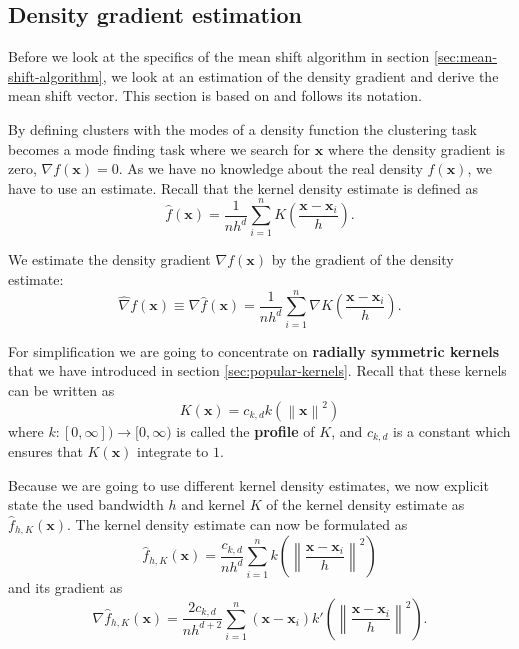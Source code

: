 \documentclass{article}
\newcommand{\norm}[1]{\left\lVert#1\right\rVert}
\begin{document}
\subsection{Density gradient estimation} \label{sec:density-gradient-estimation}

Before we look at the specifics of the mean shift algorithm in section \ref{sec:mean-shift-algorithm}, we look at an estimation of the density gradient and derive the mean shift vector. This section is based on \cite{Comaniciu.2002} and follows its notation.

By defining clusters with the modes of a density function the clustering task becomes a mode finding task where we search for $\bm{x}$ where the density gradient is zero, $\nabla f(\bm{x}) = 0$. As we have no knowledge about the real density $f(\bm{x})$, we have to use an estimate. Recall that the kernel density estimate is defined as
\begin{equation}
	\hat{f}(\bm{x}) = \frac{1}{nh^d} \sum_{i=1}^n K\left(\frac{\bm{x} - \bm{x}_i}{h} \right)\text{.}
\end{equation}

We estimate the density gradient $\nabla f(\bm{x})$ by the gradient of the density estimate:
\begin{equation}
	\hat\nabla f(\bm{x}) \equiv \nabla \hat{f}(\bm{x}) = \frac{1}{nh^d} \sum_{i=1}^n \nabla K\left(\frac{\bm{x} - \bm{x}_i}{h} \right)\text{.}
\end{equation}

For simplification we are going to concentrate on \textbf{radially symmetric kernels} that we have introduced in section \ref{sec:popular-kernels}. Recall that these kernels can be written as
\begin{equation}
	K(\bm{x}) = c_{k,d} k(\norm{\bm{x}}^2)
\end{equation}
where $k : [0, \infty]) \rightarrow [0, \infty)$ is called the \textbf{profile} of $K$, and $c_{k,d}$ is a constant which ensures that $K(\bm{x})$ integrate to $1$.

Because we are going to use different kernel density estimates, we now explicit state the used bandwidth $h$ and kernel $K$ of the kernel density estimate as $\hat{f}_{h,K}(\bm{x})$. The kernel density estimate can now be formulated as
\begin{equation}
	\hat{f}_{h,K}(\bm{x}) = \frac{c_{k,d}}{nh^d} \sum_{i=1}^n k\left(\norm{\frac{\bm{x} - \bm{x}_i}{h}}^2 \right)
\end{equation}
and its gradient as
\begin{equation}
	\nabla \hat{f}_{h,K}(\bm{x}) = \frac{2c_{k,d}}{nh^{d+2}} \sum_{i=1}^n (\bm{x} - \bm{x}_i)k'\left(\norm{\frac{\bm{x} - \bm{x}_i}{h}}^2 \right)\text{.}
\end{equation}
\end{document}
